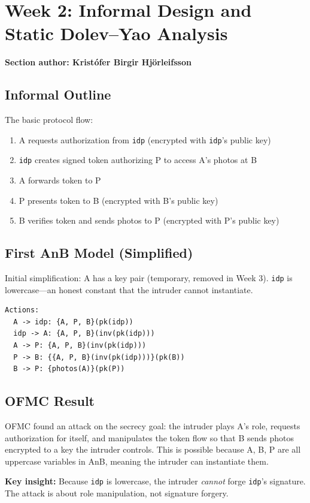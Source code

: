 \documentclass[11pt,a4paper]{article}
\newcommand{\sectionauthor}[1]{\noindent\textbf{Section author: #1}\par\medskip}
\begin{document}
\section{Week 2: Informal Design and Static Dolev--Yao Analysis}
\sectionauthor{Kristófer Birgir Hjörleifsson}

\subsection{Informal Outline}
The basic protocol flow:
\begin{enumerate}
  \item A requests authorization from \texttt{idp} (encrypted with \texttt{idp}'s public key)
  \item \texttt{idp} creates signed token authorizing P to access A's photos at B
  \item A forwards token to P
  \item P presents token to B (encrypted with B's public key)
  \item B verifies token and sends photos to P (encrypted with P's public key)
\end{enumerate}

\subsection{First AnB Model (Simplified)}
Initial simplification: A has a key pair (temporary, removed in Week 3).
\texttt{idp} is lowercase---an honest constant that the intruder cannot instantiate.

\begin{lstlisting}[style=anb,caption={Week 2 protocol}]
Actions:
  A -> idp: {A, P, B}(pk(idp))
  idp -> A: {A, P, B}(inv(pk(idp)))
  A -> P: {A, P, B}(inv(pk(idp)))
  P -> B: {{A, P, B}(inv(pk(idp)))}(pk(B))
  B -> P: {photos(A)}(pk(P))
\end{lstlisting}

\subsection{OFMC Result}
OFMC found an attack on the secrecy goal: the intruder plays A's role, requests authorization
for itself, and manipulates the token flow so that B sends photos encrypted to a key the intruder
controls. This is possible because A, B, P are all uppercase variables in AnB, meaning the
intruder can instantiate them.

\textbf{Key insight:} Because \texttt{idp} is lowercase, the intruder \emph{cannot} forge
\texttt{idp}'s signature. The attack is about role manipulation, not signature forgery.
\end{document}
